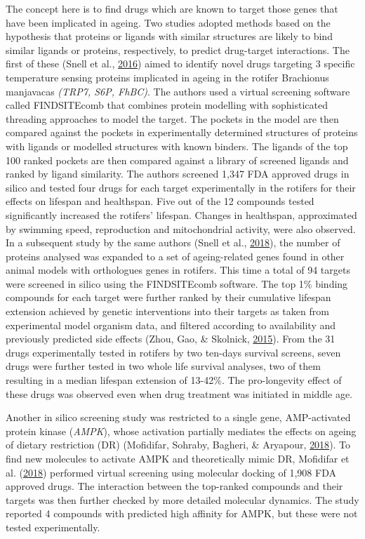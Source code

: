 \documentclass[12pt,twoside]{unicam}
\begin{document}
The concept here is to find drugs which are known to target those genes that have been implicated in ageing. Two studies adopted methods based on the hypothesis that proteins or ligands with similar structures are likely to bind similar ligands or proteins, respectively, to predict drug-target interactions. The first of these (Snell et al., \protect\hyperlink{ref-Snell2016}{2016}) aimed to identify novel drugs targeting 3 specific temperature sensing proteins implicated in ageing in the rotifer Brachionus manjavacas \emph{(TRP7, S6P, FhBC)}. The authors used a virtual screening software called FINDSITEcomb that combines protein modelling with sophisticated threading approaches to model the target. The pockets in the model are then compared against the pockets in experimentally determined structures of proteins with ligands or modelled structures with known binders. The ligands of the top 100 ranked pockets are then compared against a library of screened ligands and ranked by ligand similarity. The authors screened 1,347 FDA approved drugs in silico and tested four drugs for each target experimentally in the rotifers for their effects on lifespan and healthspan. Five out of the 12 compounds tested significantly increased the rotifers' lifespan. Changes in healthspan, approximated by swimming speed, reproduction and mitochondrial activity, were also observed. In a subsequent study by the same authors (Snell et al., \protect\hyperlink{ref-Snell2018}{2018}), the number of proteins analysed was expanded to a set of ageing-related genes found in other animal models with orthologues genes in rotifers. This time a total of 94 targets were screened in silico using the FINDSITEcomb software. The top 1\% binding compounds for each target were further ranked by their cumulative lifespan extension achieved by genetic interventions into their targets as taken from experimental model organism data, and filtered according to availability and previously predicted side effects (Zhou, Gao, \& Skolnick, \protect\hyperlink{ref-Zhou2015}{2015}). From the 31 drugs experimentally tested in rotifers by two ten-days survival screens, seven drugs were further tested in two whole life survival analyses, two of them resulting in a median lifespan extension of 13-42\%. The pro-longevity effect of these drugs was observed even when drug treatment was initiated in middle age.

Another in silico screening study was restricted to a single gene, AMP-activated protein kinase (\emph{AMPK}), whose activation partially mediates the effects on ageing of dietary restriction (DR) (Mofidifar, Sohraby, Bagheri, \& Aryapour, \protect\hyperlink{ref-Mofidifar2018}{2018}). To find new molecules to activate AMPK and theoretically mimic DR, Mofidifar et al. (\protect\hyperlink{ref-Mofidifar2018}{2018}) performed virtual screening using molecular docking of 1,908 FDA approved drugs. The interaction between the top-ranked compounds and their targets was then further checked by more detailed molecular dynamics. The study reported 4 compounds with predicted high affinity for AMPK, but these were not tested experimentally.
\end{document}
